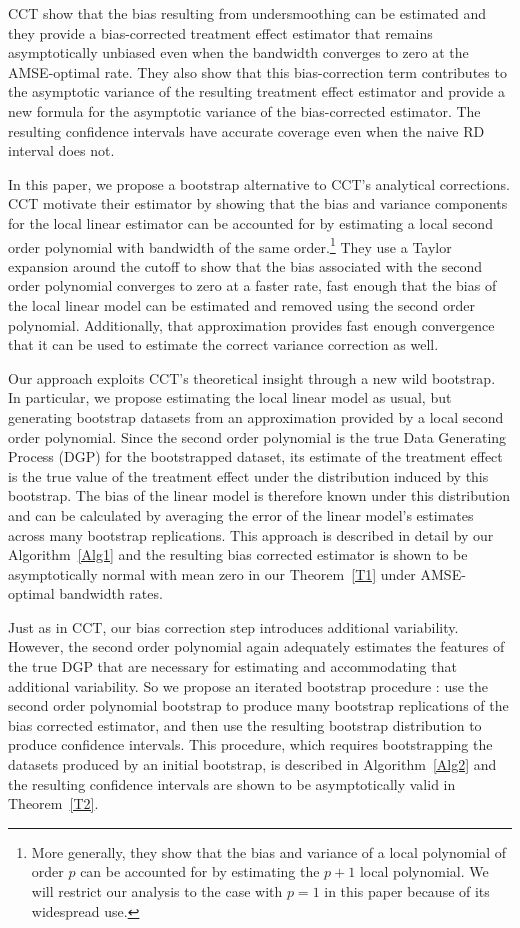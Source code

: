 \documentclass[12pt,fleqn]{article}
\begin{document}
CCT show that the bias resulting from undersmoothing can be estimated and they
provide a bias-corrected treatment effect estimator that remains
asymptotically unbiased even when the bandwidth converges to zero at the
AMSE-optimal rate. They also show that this bias-correction term contributes
to the asymptotic variance of the resulting treatment effect estimator and
provide a new formula for the asymptotic variance of the bias-corrected
estimator. The resulting confidence intervals have accurate coverage even when
the naive RD interval does not.

In this paper, we propose a bootstrap alternative to CCT's analytical
corrections. CCT motivate their estimator by showing that the bias and
variance components for the local linear estimator can be accounted for by
estimating a local second order polynomial with bandwidth of the same
order.\footnote{%
  More generally, they show that the bias and variance of a local polynomial
  of order $p$ can be accounted for by estimating the $p+1$ local
  polynomial. We will restrict our analysis to the case with $p = 1$ in this
  paper because of its widespread use.} %
They use a Taylor expansion around the cutoff to show that the bias associated
with the second order polynomial converges to zero at a faster rate, fast
enough that the bias of the local linear model can be estimated and removed
using the second order polynomial. Additionally, that approximation provides
fast enough convergence that it can be used to estimate the correct variance
correction as well.

Our approach exploits CCT's theoretical insight through a new wild
bootstrap. In particular, we propose estimating the local linear model as usual,
but generating bootstrap datasets from an approximation provided by a local
second order polynomial. Since the second order polynomial is the true Data
Generating Process (DGP) for the bootstrapped dataset,
its estimate of the treatment effect is the true value of the treatment effect
under the distribution induced by this bootstrap. The bias of the linear model
is therefore known
under this distribution and can be calculated by averaging the error of the
linear model's estimates across many bootstrap replications. This approach is
described in detail by our Algorithm~\ref{Alg1} and the resulting bias corrected
estimator is shown to be asymptotically normal with mean zero in our
Theorem~\ref{T1} under AMSE-optimal bandwidth rates.

Just as in CCT, our bias correction step introduces additional
variability. However, the second order polynomial again adequately estimates the
features of the true DGP that are necessary for estimating and accommodating that
additional variability. So we propose
an iterated bootstrap procedure \citep{hall1988}: use the second order
polynomial bootstrap to produce many bootstrap replications of the bias
corrected estimator, and then use the resulting bootstrap distribution to
produce confidence intervals. This procedure, which requires bootstrapping the
datasets produced by an initial bootstrap, is described in Algorithm~\ref{Alg2}
and the resulting confidence intervals are shown to be asymptotically valid in
Theorem~\ref{T2}.
\end{document}
